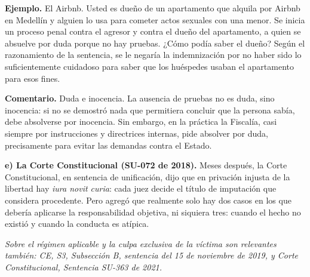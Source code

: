 \begin{ejemplo}
\textcolor[HTML]{4F6228}{\textbf{Ejemplo. }}El Airbnb. Usted es dueño de un apartamento que alquila por Airbnb en Medellín y alguien lo usa para cometer actos sexuales con una menor. Se inicia un proceso penal contra el agresor y contra el dueño del apartamento, a quien se absuelve por duda porque no hay pruebas. ¿Cómo podía saber el dueño? Según el razonamiento de la sentencia, se le negaría la indemnización por no haber sido lo suficientemente cuidadoso para saber que los huéspedes usaban el apartamento para esos fines.
\end{ejemplo}
\begin{comentario}
\textcolor[HTML]{8A6D3B}{\textbf{Comentario. }}Duda e inocencia. La ausencia de pruebas no es duda, sino inocencia: si no se demostró nada que permitiera concluir que la persona sabía, debe absolverse por inocencia. Sin embargo, en la práctica la Fiscalía, casi siempre por instrucciones y directrices internas, pide absolver por duda, precisamente para evitar las demandas contra el Estado.
\end{comentario}
\textbf{e) La Corte Constitucional (SU-072 de 2018).} Meses después, la Corte Constitucional, en sentencia de unificación, dijo que en privación injusta de la libertad hay \textit{iura novit curia}: cada juez decide el título de imputación que considera procedente. Pero agregó que realmente solo hay dos casos en los que debería aplicarse la responsabilidad objetiva, ni siquiera tres: cuando el hecho no existió y cuando la conducta es atípica.

{\small \textcolor[HTML]{6B6B6B}{\textit{Sobre el régimen aplicable y la culpa exclusiva de la víctima son relevantes también: CE, S3, Subsección B, sentencia del 15 de noviembre de 2019, y Corte Constitucional, Sentencia SU-363 de 2021.}}}

